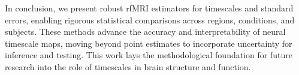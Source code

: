 \documentclass[docs/main.tex]{subfiles}
\begin{document}
In conclusion, we present robust rfMRI estimators for timescales and standard errors, enabling rigorous statistical comparisons across regions, conditions, and subjects. These methods advance the accuracy and interpretability of neural timescale maps, moving beyond point estimates to incorporate uncertainty for inference and testing. This work lays the methodological foundation for future research into the role of timescales in brain structure and function.
\end{document}

